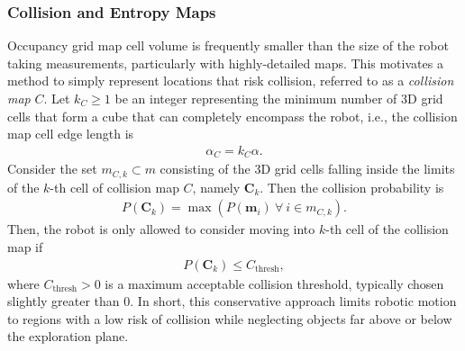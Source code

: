 \subsubsection{Collision and Entropy Maps}
Occupancy grid map cell volume is frequently smaller than the size of the robot taking measurements, particularly with highly-detailed maps. This motivates a method to simply represent locations that risk collision, referred to as a \emph{collision map} $C$. Let $k_C\geq1$ be an integer representing the minimum number of 3D grid cells that form a cube that can completely encompass the robot, i.e., the collision map cell edge length is
\begin{align}
\label{eqn:alphaC}
\alpha_C=k_C\alpha.
\end{align}
Consider the set $ m_{C,k}\subset m$ consisting of the 3D grid cells falling inside the limits of the $k$-th cell of collision map $C$, namely $\mathbf{C}_k$. Then the collision probability is
\begin{align}
P(\mathbf{C}_k)=\max{(P(\mathbf{m}_i)\ \forall \ i\in m_{C,k})}.
\end{align}
Then, the robot is only allowed to consider moving into $k$-th cell of the collision map if
\begin{align}
P(\mathbf{C}_k) \leq C_\text{thresh},
\end{align}
where $C_\text{thresh}>0$ is a maximum acceptable collision threshold, typically chosen slightly greater than $0$. In short, this conservative approach limits robotic motion to regions with a low risk of collision while neglecting objects far above or below the exploration plane.

